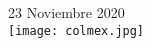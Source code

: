 \begin{titlepage}
	
	
	{\large 23 Noviembre 2020}\\[2cm] %
	
	
\texttt{[image: colmex.jpg]}\\ %
	
	
	\vfill %
	
\end{titlepage}